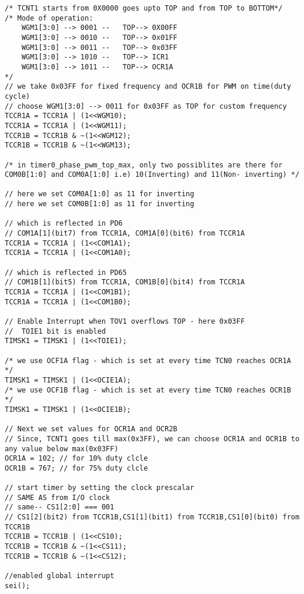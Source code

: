 \begin{verbatim}
/* TCNT1 starts from 0X0000 goes upto TOP and from TOP to BOTTOM*/
/* Mode of operation:
    WGM1[3:0] --> 0001 --	TOP--> 0X00FF
    WGM1[3:0] --> 0010 --	TOP--> 0x01FF
    WGM1[3:0] --> 0011 --	TOP--> 0x03FF
    WGM1[3:0] --> 1010 --	TOP--> ICR1
    WGM1[3:0] --> 1011 --	TOP--> OCR1A
*/	
// we take 0x03FF for fixed frequency and OCR1B for PWM on time(duty cycle)	
// choose WGM1[3:0] --> 0011 for 0x03FF as TOP for custom frequency
TCCR1A = TCCR1A | (1<<WGM10);
TCCR1A = TCCR1A | (1<<WGM11);
TCCR1B = TCCR1B & ~(1<<WGM12);
TCCR1B = TCCR1B & ~(1<<WGM13);

/* in timer0_phase_pwm_top_max, only two possiblites are there for COM0B[1:0] and COM0A[1:0] i.e) 10(Inverting) and 11(Non- inverting) */

// here we set COM0A[1:0] as 11 for inverting
// here we set COM0B[1:0] as 11 for inverting

// which is reflected in PD6
// COM1A[1](bit7) from TCCR1A, COM1A[0](bit6) from TCCR1A
TCCR1A = TCCR1A | (1<<COM1A1);
TCCR1A = TCCR1A | (1<<COM1A0);

// which is reflected in PD65
// COM1B[1](bit5) from TCCR1A, COM1B[0](bit4) from TCCR1A	
TCCR1A = TCCR1A | (1<<COM1B1);
TCCR1A = TCCR1A | (1<<COM1B0);

// Enable Interrupt when TOV1 overflows TOP - here 0x03FF
//  TOIE1 bit is enabled
TIMSK1 = TIMSK1 | (1<<TOIE1);

/* we use OCF1A flag - which is set at every time TCN0 reaches OCR1A */
TIMSK1 = TIMSK1 | (1<<OCIE1A);
/* we use OCF1B flag - which is set at every time TCN0 reaches OCR1B */
TIMSK1 = TIMSK1 | (1<<OCIE1B);

// Next we set values for OCR1A and OCR2B
// Since, TCNT1 goes till max(0x3FF), we can choose OCR1A and OCR1B to any value below max(0x03FF)
OCR1A = 102; // for 10% duty clcle
OCR1B = 767; // for 75% duty clcle

// start timer by setting the clock prescalar
// SAME AS from I/O clock
// same-- CS1[2:0] === 001
// CS1[2](bit2) from TCCR1B,CS1[1](bit1) from TCCR1B,CS1[0](bit0) from TCCR1B
TCCR1B = TCCR1B | (1<<CS10);
TCCR1B = TCCR1B & ~(1<<CS11);
TCCR1B = TCCR1B & ~(1<<CS12);

//enabled global interrupt
sei();
\end{verbatim}


